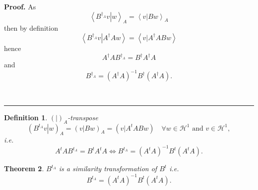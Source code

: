 \documentclass[aps,preprint]{revtex4}%
\newtheorem{theorem}{Theorem}
\newtheorem{definition}[theorem]{Definition}
\newenvironment{proof}[1][Proof]{\noindent\textbf{#1.} }{\ \rule{0.5em}{0.5em}}
\begin{document}
\begin{proof}
As%
\begin{equation}
\left\langle \left.  B^{\dagger_{A}}v\right\vert w\right\rangle _{A}%
=\left\langle \left.  v\right\vert Bw\right\rangle _{A}%
\end{equation}
then by definition
\begin{equation}
\left\langle \left.  B^{\dagger_{A}}v\right\vert A^{\dagger}Aw\right\rangle
=\left\langle \left.  v\right\vert A^{\dagger}ABw\right\rangle
\end{equation}
hence
\begin{equation}
A^{\dagger}AB^{\dagger_{A}}=B^{\dagger}A^{\dagger}A
\end{equation}
and
\begin{equation}
B^{\dagger_{A}}=\left(  A^{\dagger}A\right)  ^{-1}B^{\dagger}\left(
A^{\dagger}A\right)  .
\end{equation}

\end{proof}

\begin{definition}
$\left(  \left.  {}\right\vert \right)  _{A}$-transpose
\begin{equation}
\left(  \left.  B^{t_{A}}v\right\vert w\right)  _{A}=\left(  \left.
v\right\vert Bw\right)  _{A}=\left(  \left.  v\right\vert A^{t}ABw\right)
\quad\forall w\in\mathcal{H}^{1}\text{ and }v\in\mathcal{H}^{1},
\end{equation}
i.e.
\begin{equation}
A^{t}AB^{t_{A}}=B^{t}A^{t}A\Longleftrightarrow B^{t_{A}}=\left(
A^{t}A\right)  ^{-1}B^{t}\left(  A^{t}A\right)  .
\end{equation}

\end{definition}

\begin{theorem}
$B^{t_{A}}$ is a similarity transformation of $B^{t}$ i.e.
\begin{equation}
B^{t_{A}}=\left(  A^{t}A\right)  ^{-1}B^{t}\left(  A^{t}A\right)  .
\end{equation}

\end{theorem}
\end{document}

